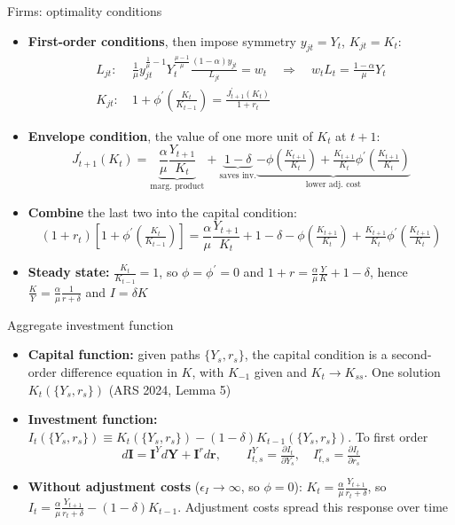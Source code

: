 \documentclass[10pt,english]{beamer}
\begin{document}
%
\begin{frame}{Firms: optimality conditions}
\vspace{-1mm}
\begin{itemize}
\item <+->\textbf{First-order conditions}, then impose symmetry $y_{jt}=Y_{t}$, $K_{jt}=K_{t}$:
\begin{align*}
L_{jt}: & \ \tfrac{1}{\mu}y_{jt}^{\frac{1}{\mu}-1}Y_{t}^{\frac{\mu-1}{\mu}}\tfrac{(1-\alpha)y_{jt}}{L_{jt}}=w_{t}\quad\Rightarrow\quad w_{t}L_{t}=\tfrac{1-\alpha}{\mu}Y_{t}\\
K_{jt}: & \ 1+\phi^{\prime}\left(\tfrac{K_{t}}{K_{t-1}}\right)=\frac{J_{t+1}^{\prime}(K_{t})}{1+r_{t}}
\end{align*}
\item <+->\textbf{Envelope condition}, the value of one more unit of $K_{t}$ at $t+1$:
\[
J_{t+1}^{\prime}(K_{t})=\underbrace{\frac{\alpha}{\mu}\frac{Y_{t+1}}{K_{t}}}_{\text{marg. product}}+\underbrace{1-\delta}_{\text{saves inv.}}\underbrace{-\phi\left(\tfrac{K_{t+1}}{K_{t}}\right)+\tfrac{K_{t+1}}{K_{t}}\phi^{\prime}\left(\tfrac{K_{t+1}}{K_{t}}\right)}_{\text{lower adj. cost}}
\]
\item <+->\textbf{Combine} the last two into the capital condition:
\[
(1+r_{t})\left[1+\phi^{\prime}\left(\tfrac{K_{t}}{K_{t-1}}\right)\right]=\frac{\alpha}{\mu}\frac{Y_{t+1}}{K_{t}}+1-\delta-\phi\left(\tfrac{K_{t+1}}{K_{t}}\right)+\tfrac{K_{t+1}}{K_{t}}\phi^{\prime}\left(\tfrac{K_{t+1}}{K_{t}}\right)
\]
\item <+->\textbf{Steady state:} $\frac{K_{t}}{K_{t-1}}=1$, so $\phi=\phi^{\prime}=0$ and $1+r=\frac{\alpha}{\mu}\frac{Y}{K}+1-\delta$, hence $\frac{K}{Y}=\frac{\alpha}{\mu}\frac{1}{r+\delta}$ and $I=\delta K$
\end{itemize}
\end{frame}
%
\begin{frame}{Aggregate investment function}
\vspace{-1mm}
\begin{itemize}
\item <+->\textbf{Capital function:} given paths $\{Y_{s},r_{s}\}$, the capital condition is a second-order difference equation in $K$, with $K_{-1}$ given and $K_{t}\to K_{ss}$. One solution $K_{t}(\{Y_{s},r_{s}\})$ (ARS 2024, Lemma 5)
\item <+->\textbf{Investment function:} $I_{t}(\{Y_{s},r_{s}\})\equiv K_{t}(\{Y_{s},r_{s}\})-(1-\delta)K_{t-1}(\{Y_{s},r_{s}\})$. To first order
\[
d\boldsymbol{I}=\boldsymbol{I}^{Y}d\boldsymbol{Y}+\boldsymbol{I}^{r}d\boldsymbol{r},\qquad I_{t,s}^{Y}=\tfrac{\partial I_{t}}{\partial Y_{s}},\quad I_{t,s}^{r}=\tfrac{\partial I_{t}}{\partial r_{s}}
\]
\item <+->\textbf{Without adjustment costs} ($\epsilon_{I}\to\infty$, so $\phi=0$): $K_{t}=\frac{\alpha}{\mu}\frac{Y_{t+1}}{r_{t}+\delta}$, so $I_{t}=\frac{\alpha}{\mu}\frac{Y_{t+1}}{r_{t}+\delta}-(1-\delta)K_{t-1}$. Adjustment costs spread this response over time
\end{itemize}
\end{frame}
\end{document}
